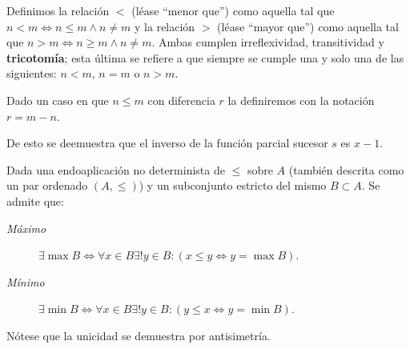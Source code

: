 \documentclass[11pt,oneside,a4paper]{book}
\begin{document}
Definimos la relación $\lt$ (léase ``menor que'') como aquella tal que $n\lt m\iff n\leq m\wedge n\neq m$ y la relación $\gt$ (léase ``mayor que'') como aquella tal que $n\gt m\iff n\geq m\wedge n\neq m$. Ambas cumplen irreflexividad, transitividad y \textbf{tricotomía}; esta última se refiere a que siempre se cumple una y solo una de las siguientes: $n\lt m$, $n=m$ o $n\gt m$.
\begin{mydef}
Dado un caso en que $n\leq m$ con diferencia $r$ la definiremos con la notación $r=m-n$.
\end{mydef}
De esto se deemuestra que el inverso de la función parcial sucesor $s$ es $x-1$.
\begin{mydef}
Dada una endoaplicación no determinista de $\leq$ sobre $A$ (también descrita como un par ordenado $(A,\leq)$) y un subconjunto estricto del mismo $B\subset A$. Se admite que:
\begin{description}
\item[\it Máximo] $\exists\max B\iff\forall x\in B\exists!y\in B:(x\leq y\iff y=\max B)$.
\item[\it Mínimo] $\exists\min B\iff\forall x\in B\exists!y\in B:(y\leq x\iff y=\min B)$.
\end{description}
\end{mydef}
Nótese que la unicidad se demuestra por antisimetría.
\end{document}
